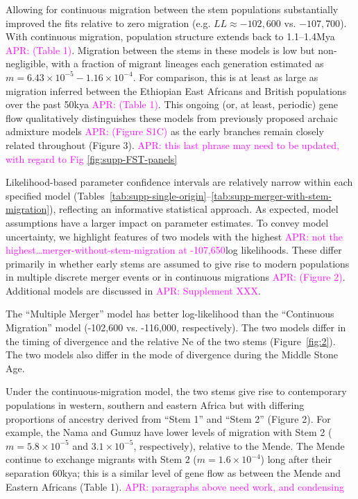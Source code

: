 \documentclass[]{article}
\newcommand{\aprcomment}[1]{{\textcolor{magenta}{APR: #1}}}
\begin{document}
Allowing for continuous migration between the stem populations substantially
improved the fits relative to zero migration (e.g. $LL \approx -102,600$ vs.
$-107,700$). With continuous migration, population structure extends back to
1.1--1.4Mya \aprcomment{(Table 1)}. Migration between the stems in these models
is low but non-negligible, with a fraction of migrant lineages each generation
estimated as $m=6.43\times10^{-5}-1.16\times10^{-4}$. For comparison, this is
at least as large as migration inferred between the Ethiopian East Africans and
British populations over the past 50kya \aprcomment{(Table 1)}. This ongoing
(or, at least, periodic) gene flow qualitatively distinguishes these models
from previously proposed archaic admixture models \aprcomment{(Figure S1C)} as
the early branches remain closely related throughout (Figure 3).
\aprcomment{this last phrase may need to be updated, with regard to Fig
\ref{fig:supp-FST-panels}}

Likelihood-based parameter confidence intervals are relatively narrow within
each specified model
(Tables~\ref{tab:supp-single-origin}--\ref{tab:supp-merger-with-stem-migration}),
reflecting an informative statistical approach. As expected, model assumptions
have a larger impact on parameter estimates. To convey model uncertainty, we
highlight features of two models with the highest \aprcomment{not the
highest\ldots merger-without-stem-migration at -107,650}log likelihoods. These
differ primarily in whether early stems are assumed to give rise to modern
populations in multiple discrete merger events or in continuous migrations
\aprcomment{(Figure 2)}. Additional models are discussed in
\aprcomment{Supplement XXX}.

The “Multiple Merger” model has better log-likelihood than the “Continuous
Migration” model (-102,600 vs. -116,000, respectively). The two models differ
in the timing of divergence and the relative Ne of the two stems
(Figure~\ref{fig:2}). The two models also differ in the mode of divergence
during the Middle Stone Age. 

Under the continuous-migration model, the two stems give rise to contemporary
populations in western, southern and eastern Africa but with differing
proportions of ancestry derived from “Stem 1” and “Stem 2” (Figure 2). For
example, the Nama and Gumuz have lower levels of migration with Stem 2
($m=5.8\times10^{-5}$ and $3.1\times10^{-5}$, respectively), relative to the
Mende. The Mende continue to exchange migrants with Stem 2
($m=1.6\times10^{-4}$) long after their separation 60kya; this is a similar
level of gene flow as between the Mende and Eastern Africans (Table 1). 
\aprcomment{paragraphs above need work, and condensing}
\end{document}
